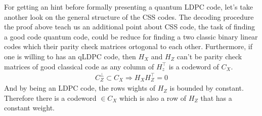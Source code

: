   For getting an hint before formally presenting a quantum LDPC code, let's take another look on the general structure of the CSS codes. The decoding procedure the proof above teach us an additional point about CSS code, the task of finding a good code quantum code, could be reduce for finding a two classic binary linear codes which their parity check matrices ortogonal to each other. Furthermore, if one is willing to has an qLDPC code, then $H_{X}$ and $H_{Z}$ can't be parity check matrices of good classical code as any column of $H_{z}^{\top}$ is a codeword of $C_{X}$. 
  \begin{equation*}
    \begin{split}
      C_{Z}^{\perp} \subset C_{X} \Rightarrow H_{X}H_{Z}^{\top} = 0 
    \end{split}
  \end{equation*}
  And by being an LDPC code, the rows wights of $H_{Z}$ is bounded by constant. Therefore there is a codeword $\in C_{X}$ which is also a row of $H_{Z}$ that has a constant weight.  
\ifdefined\CSSDOC

\fi 
